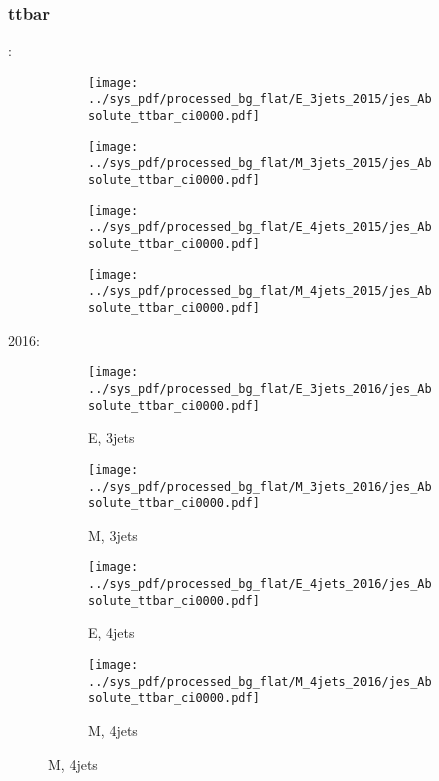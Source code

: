 \documentclass{beamer}
\begin{document}
\begin{frame}
\frametitle{ttbar}
\fontsize{5}{1}:
\begin{figure}
\centering
\begin{subfigure}[b]{0.24\textwidth}
\texttt{[image: ../sys\_pdf/processed\_bg\_flat/E\_3jets\_2015/jes\_Absolute\_ttbar\_ci0000.pdf]}
\end{subfigure}
\begin{subfigure}[b]{0.24\textwidth}
\texttt{[image: ../sys\_pdf/processed\_bg\_flat/M\_3jets\_2015/jes\_Absolute\_ttbar\_ci0000.pdf]}
\end{subfigure}
\begin{subfigure}[b]{0.24\textwidth}
\texttt{[image: ../sys\_pdf/processed\_bg\_flat/E\_4jets\_2015/jes\_Absolute\_ttbar\_ci0000.pdf]}
\end{subfigure}
\begin{subfigure}[b]{0.24\textwidth}
\texttt{[image: ../sys\_pdf/processed\_bg\_flat/M\_4jets\_2015/jes\_Absolute\_ttbar\_ci0000.pdf]}
\end{subfigure}
\end{figure}
2016:
\begin{figure}
\centering
\begin{subfigure}[b]{0.24\textwidth}
\texttt{[image: ../sys\_pdf/processed\_bg\_flat/E\_3jets\_2016/jes\_Absolute\_ttbar\_ci0000.pdf]}
\captionsetup{font=tiny}
\caption{E, 3jets}
\end{subfigure}
\begin{subfigure}[b]{0.24\textwidth}
\texttt{[image: ../sys\_pdf/processed\_bg\_flat/M\_3jets\_2016/jes\_Absolute\_ttbar\_ci0000.pdf]}
\captionsetup{font=tiny}
\caption{M, 3jets}
\end{subfigure}
\begin{subfigure}[b]{0.24\textwidth}
\texttt{[image: ../sys\_pdf/processed\_bg\_flat/E\_4jets\_2016/jes\_Absolute\_ttbar\_ci0000.pdf]}
\captionsetup{font=tiny}
\caption{E, 4jets}
\end{subfigure}
\begin{subfigure}[b]{0.24\textwidth}
\texttt{[image: ../sys\_pdf/processed\_bg\_flat/M\_4jets\_2016/jes\_Absolute\_ttbar\_ci0000.pdf]}
\captionsetup{font=tiny}
\caption{M, 4jets}
\end{subfigure}
\end{figure}
\end{frame}
\end{document}
